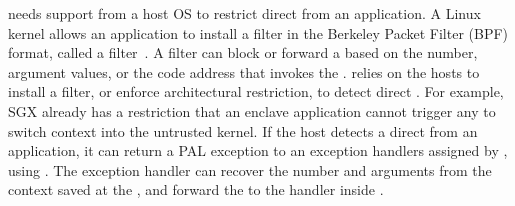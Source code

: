 \thelibos{} needs support from a host OS to restrict direct \linuxapis{} from an application.
A Linux kernel allows an application to install a \linuxapi{} filter in the Berkeley Packet Filter (BPF) format,
called a \seccomp{} filter~\cite{seccomp}.
A \seccomp{} filter can block or forward a \linuxapi{} based on the \linuxapi{} number,
argument values, or the code address that invokes the \linuxapi{}.
\graphene{} relies on the hosts to install a \linuxapi{} filter, or enforce architectural restriction, to detect direct \linuxapis{}.
For example, SGX already has a restriction that an enclave application cannot trigger any \linuxapi{} to switch context into the untrusted kernel.
If the host detects a direct \linuxapi{} from an application,
it can return
a PAL exception to an exception handlers assigned by \thelibos{}, using  .
The exception handler can recover the \linuxapi{} number and arguments
from the context saved at the \linuxapi{},
and forward the \linuxapi{} to the \linuxapi{} handler
inside \thelibos{}.


